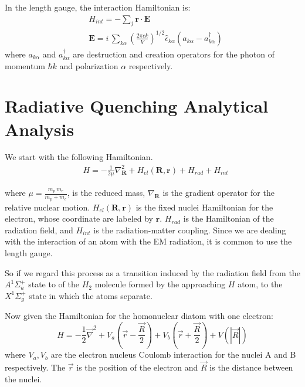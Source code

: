 In the length gauge, the interaction Hamiltonian is:
\begin{equation}
\begin{split}
& H_{int} = -\sum_j{ \mathbf{r}\cdot\mathbf{E} } \\[.8em]
& \mathbf{E} = i\,\sum_{k\alpha}{\left(\frac{2\pi c k}{V}\right)^{1/2}\hat{\epsilon}_{k\alpha}\left(a_{k\alpha} - a^{\dagger}_{k\alpha}\right)}
\end{split}
\end{equation}
where $ a_{k\alpha} $ and $ a^{\dagger}_{k\alpha} $ are destruction and creation operators for the photon of momentum $ \hbar k $ and polarization $ \alpha $ respectively.

\section{Radiative Quenching Analytical Analysis}

We start with the following Hamiltonian.
\begin{equation}\label{eqH1} 
\begin{split} 
& H = -\frac{1}{2\mu}\nabla^2_{\mathbf{R}} + H_{el}(\mathbf{R},\mathbf{r}) + H_{rad} + H_{int} 
\end{split} 
\end{equation} 

where $ \mu = \frac{m_p\,m_e}{m_p + m_e} $, is the reduced mass, $ \nabla_{\mathbf{R}} $ is the gradient operator for the relative nuclear motion. $ H_{el}(\mathbf{R},\mathbf{r}) $ is the fixed nuclei Hamiltonian for the electron, whose coordinate are labeled by $ \mathbf{r} $. $ H_{rad} $ is the Hamiltonian of the radiation field, and $ H_{int} $ is the radiation-matter coupling. Since we are dealing with the interaction of an atom with the EM radiation, it is common to use the length gauge.  

So if we regard this process as a transition induced by the radiation field from the $ A^{1}\Sigma^{+}_u $ state to of the $ H_2 $ molecule formed by the approaching $ H $ atom, to the $ X^{1}\Sigma^{+}_g $ state in which the atoms separate.

Now given the Hamiltonian for the homonuclear diatom with one electron:
\begin{equation}\label{hdia}
  H = -\frac{1}{2}\vec{\nabla}^2 + V_a(\vec{r} - \frac{\vec{R}}{2}) + V_b(\vec{r} + \frac{\vec{R}}{2}) + V(|\vec{R}|) 
\end{equation}
where $ V_a, V_b $ are the electron nucleus Coulomb interaction for the nuclei A and B respectively. The $ \vec{r} $ is the position of the electron and $ \vec{R} $ is the distance between the nuclei.

